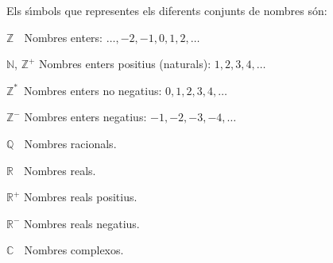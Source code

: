 \pagebreak
Els s\'{\i}mbols que representes els diferents conjunts de nombres s\'{o}n:

\begin{list}{}
{\setlength{\labelwidth}{15mm} \setlength{\leftmargin}{20mm}
\setlength{\labelsep}{5mm}}
    \item[$\mathbb{Z\phantom{{}^+}}$] Nombres enters: $\ldots,-2,-1,0,1,2,\ldots$
    \item[$\mathbb{N}$, $\mathbb{Z}^+$] Nombres enters positius
    (naturals): $1,2,3,4,\ldots$
    \item[$\mathbb{Z}^*\,$] Nombres enters no negatius: $0,1,2,3,4,\ldots$
    \item[$\mathbb{Z}^-$] Nombres enters negatius: $-1,-2,-3,-4,\ldots$
    \item[$\mathbb{Q\phantom{{}^+}}$] Nombres racionals.
    \item[$\mathbb{R\phantom{{}^+}}$] Nombres reals.
    \item[$\mathbb{R}^+$] Nombres reals positius.
    \item[$\mathbb{R}^-$] Nombres reals negatius.
    \item[$\mathbb{C\phantom{{}^+}}$] Nombres complexos.
\end{list}
 
 
 
 
 
